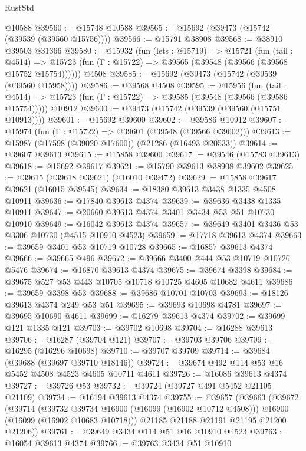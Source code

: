 \begin{lexlean}{RustStd}
\begin{coremodule}
    @10588
@39560 := @15748 @10588
@39565 := @15692 (@39473 (@15742 (@39539 (@39560 @15756))))
@39566 := @15791 @38908
@39568 := @38910 @39503 @31366
@39580 := @15932
    (fun (lets : @15719) =>
    @15721
      (fun (tail : @4514) =>
      @15723 (fun (Γ : @15722) => @39565 (@39548 (@39566 (@39568 @15752 @15754))))))
    @4508
@39585 := @15692 (@39473 (@15742 (@39539 (@39560 @15958))))
@39586 := @39568 @4508
@39595 := @15956
    (fun (tail : @4514) => @15723 (fun (Γ : @15722) => @39585 (@39548 (@39566 (@39586 @15754)))))
    @10912
@39600 := @39473 (@15742 (@39539 (@39560 (@15751 @10913))))
@39601 := @15692 @39600
@39602 := @39586 @10912
@39607 := @15974 (fun (Γ : @15722) => @39601 (@39548 (@39566 @39602)))
@39613 := @15987 (@17598 (@39020 @17600)) (@21286 (@16493 @20533))
@39614 := @39607 @39613
@39615 := @15858 @39600
@39617 := @39546 (@15783 @39613)
@39618 := @15692 @39617
@39621 := @15790 @39613 @38908 @39602
@39625 := @39615 (@39618 @39621) (@16010 @39472)
@39629 := @15858 @39617 @39621 (@16015 @39545)
@39634 := @18380 @39613 @3438 @1335 @4508 @10911
@39636 := @17840 @39613 @4374
@39639 := @39636 @3438 @1335 @10911
@39647 := @20660 @39613 @4374 @3401 @3434 @53 @51 @10730 @10910
@39649 := @16042 @39613 @4374
@39657 := @39649 @3401 @3436 @53 @3306 @10730 (@4515 @10910 @4523)
@39659 := @17718 @39613 @4374
@39663 := @39659 @3401 @53 @10719 @10728
@39665 := @16857 @39613 @4374
@39666 := @39665 @496
@39672 := @39666 @3400 @444 @53 @10719 @10726 @5476
@39674 := @16870 @39613 @4374
@39675 := @39674 @3398
@39684 := @39675 @527 @53 @443 @10705 @10718 @10725 @4605 @10682 @4611
@39686 := @39659 @3398 @53
@39688 := @39686 @10701 @10703
@39693 := @18126 @39613 @4374 @249 @53 @51
@39695 := @39693 @10698 @4781
@39697 := @39695 @10690 @4611
@39699 := @16279 @39613 @4374
@39702 := @39699 @121 @1335 @121
@39703 := @39702 @10698
@39704 := @16288 @39613
@39706 := @16287 (@39704 @121)
@39707 := @39703 @39706
@39709 := @16295 (@16296 @10698)
@39710 := @39707 @39709
@39714 := @39684 (@39688 (@39697 @39710 @18146))
@39724 := @39674 @492 @114 @53 @16 @5452 @4508 @4523 @4605 @10711 @4611
@39726 := @16086 @39613 @4374
@39727 := @39726 @53
@39732 := @39724 (@39727 @491 @5452 @21105 @21109)
@39734 := @16194 @39613 @4374
@39755 := @39657
    (@39663
      (@39672
        (@39714
          (@39732 @39734 @16900 (@16099 (@16902 @10712 @4508)))
          @16900
          (@16099 (@16902 @10683 @10718)))
        @21185
        @21188
        @21191
        @21195
        @21200
        @21206))
@39761 := @39649 @3434 @114 @51 @16 @10910 @4523
@39763 := @16054 @39613 @4374
@39766 := @39763 @3434 @51 @10910

\end{coremodule}
\end{lexlean}
